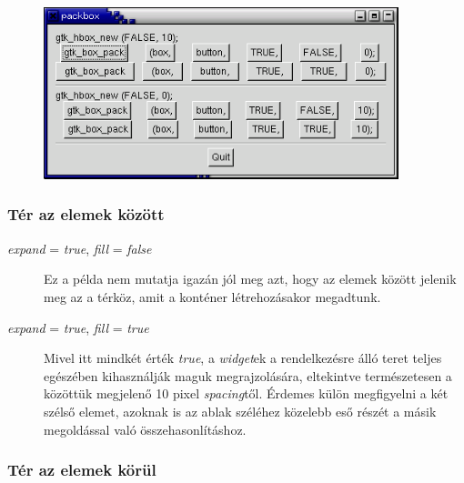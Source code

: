 \vspace{12 pt}
\begin{figure}[H]
\begin{center}
\includegraphics[height=50mm]{images/packbox2.png}
\end{center}
\end{figure}

\subsubsection{Tér az elemek között}

\begin{description}
 \item[\textit{expand} = \textit{true}, \textit{fill} = \textit{false}] Ez a példa nem mutatja igazán jól meg azt, hogy az elemek között jelenik meg az a térköz, amit a konténer létrehozásakor megadtunk.

 \item[\textit{expand} = \textit{true}, \textit{fill} = \textit{true}] Mivel itt mindkét érték \textit{true}, a \textit{widget}ek a rendelkezésre álló teret teljes egészében kihasználják maguk megrajzolására, eltekintve természetesen a közöttük megjelenő 10 pixel \textit{spacing}től. Érdemes külön megfigyelni a két szélső elemet, azoknak is az ablak széléhez közelebb eső részét a másik megoldással való összehasonlításhoz.
\end{description}

\subsubsection{Tér az elemek körül}

